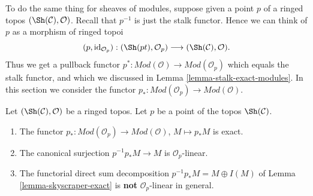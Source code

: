 \noindent
To do the same thing for sheaves of modules, suppose given a point
$p$ of a ringed topos $(\Sh(\mathcal{C}), \mathcal{O})$.
Recall that $p^{-1}$ is just the stalk functor.
Hence we can think of $p$ as a morphism of ringed topoi
$$
(p, \text{id}_{\mathcal{O}_p}) :
(\Sh(pt), \mathcal{O}_p)
\longrightarrow
(\Sh(\mathcal{C}), \mathcal{O}).
$$
Thus we get a pullback functor
$p^* : \textit{Mod}(\mathcal{O}) \to \textit{Mod}(\mathcal{O}_p)$
which equals the stalk functor, and which we discussed in
Lemma \ref{lemma-stalk-exact-modules}.
In this section we consider the functor
$p_* : \textit{Mod}(\mathcal{O}_p) \to \textit{Mod}(\mathcal{O})$.

\begin{lemma}
\label{lemma-skyscraper-modules-exact}
Let $(\Sh(\mathcal{C}), \mathcal{O})$ be a ringed topos.
Let $p$ be a point of the topos $\Sh(\mathcal{C})$.
\begin{enumerate}
\item The functor
$p_* : \textit{Mod}(\mathcal{O}_p) \to \textit{Mod}(\mathcal{O})$,
$M \mapsto p_*M$ is exact.
\item The canonical surjection $p^{-1}p_*M \to M$ is $\mathcal{O}_p$-linear.
\item The functorial direct sum decomposition
$p^{-1}p_*M = M \oplus I(M)$ of Lemma \ref{lemma-skyscraper-exact}
is {\bf not} $\mathcal{O}_p$-linear in general.
\end{enumerate}
\end{lemma}


